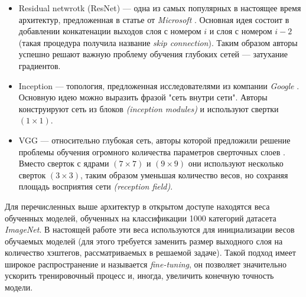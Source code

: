 \begin{itemize}

    \item Residual netwrotk (ResNet) ---
    одна из самых популярных в настоящее время архитектур,
    предложенная в статье от \textit{Microsoft} \cite{resnet}.
    Основная идея состоит в добавлении конкатенации выходов
    слоя с номером  $i$ и слоя с номером $i - 2$ (такая процедура
    получила название \textit{skip connection}). Таким образом авторы
    успешно решают важную проблему 
    обучения глубоких сетей --- затухание градиентов.
    
    \item {Inception} --- топология, предложенная исследователями 
    из компании \textit{Google} \cite{inception}. Основную идею
    можно выразить фразой "сеть внутри сети". Авторы 
    конструируют сеть из блоков \textit{(inception modules)} и
    используют свертки $(1 \times 1)$.
    
    \item {VGG} --- относительно глубокая сеть, авторы которой предложили
    решение проблемы обучения огромного количества параметров
    сверточных слоев \cite{vgg}. Вместо сверток с ядрами $(7 \times 7)$ и
    $(9 \times 9)$ они используют несколько сверток $(3 \times 3)$, таким
    образом уменьшая
    количество весов, но сохраняя 
    площадь восприятия сети \textit{(reception field)}.
    
\end{itemize}

\indent
\indent
Для перечисленных выше архитектур в открытом доступе находятся 
веса обученных моделей, обученных на классификации 1000
категорий датасета \textit{ImageNet}\cite{imagenet}. В настоящей работе
эти веса используются для инициализации весов обучаемых моделей
(для этого требуется заменить размер выходного слоя на количество
хэштегов, рассматриваемых в решаемой задаче).
Такой подход имеет широкое распространение 
и называется \textit{fine-tuning}, он позволяет значительно ускорить
тренировочный процесс и, иногда, увеличить конечную точность модели.

